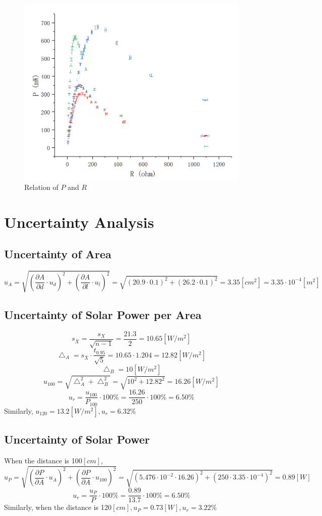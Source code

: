 \documentclass[12pt]{article}
\begin{document}
\begin{figure}[H]
\centering
\includegraphics[scale=0.45]{P6.jpg}
\caption{Relation of $P$ and $R$}
\end{figure}
\section{Uncertainty Analysis}
\subsection{Uncertainty of Area}
$$u_A=\sqrt{(\frac{\partial A}{\partial d}\cdot u_d)^2+(\frac{\partial A}{\partial l}\cdot u_l)^2}=\sqrt{(20.9\cdot0.1)^2+(26.2\cdot0.1)^2}=3.35[cm^2]=3.35\cdot10^{-4}[m^2]$$
\subsection{Uncertainty of Solar Power per Area}
$$s_{\bar{X}}=\frac{s_X}{\sqrt{n-1}}=\frac{21.3}{2}=10.65[W/m^2]$$
$$\bigtriangleup_A=s_{\bar{X}}\cdot\frac{t_{0.95}}{\sqrt{5}}=10.65\cdot1.204=12.82[W/m^2]$$
$$\bigtriangleup_B=10[W/m^2]$$
$$u_{100}=\sqrt{\bigtriangleup_A^2+\bigtriangleup_B^2}=\sqrt{10^2+12.82^2}=16.26[W/m^2]$$
$$u_r=\frac{u_{100}}{P_{100}}\cdot100\%=\frac{16.26}{250}\cdot100\%=6.50\%$$
Similarly, $u_{120}=13.2[W/m^2],u_r=6.32\%$
\subsection{Uncertainty of Solar Power}
When the distance is 100$[cm]$,
$$u_P=\sqrt{(\frac{\partial P}{\partial A}\cdot u_A)^2+(\frac{\partial P}{\partial A}\cdot u_{100})^2}=\sqrt{(5.476\cdot10^{-2}\cdot16.26)^2+(250\cdot3.35\cdot10^{-4})^2}=0.89[W]$$
$$u_r=\frac{u_P}{P}\cdot100\%=\frac{0.89}{13.7}\cdot100\%=6.50\%$$
Similarly, when the distance is 120$[cm],u_P=0.73[W],u_r=3.22\%$
\end{document}
